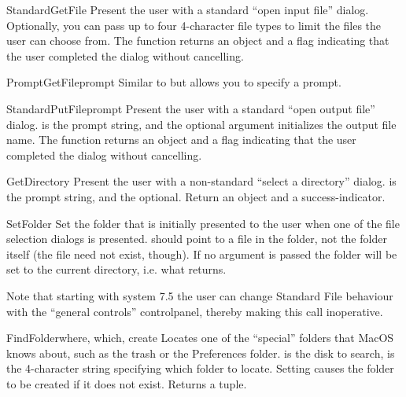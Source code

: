 \begin{funcdesc}{StandardGetFile}{}
Present the user with a standard ``open input file''
dialog. Optionally, you can pass up to four 4-character file types to limit
the files the user can choose from. The function returns an 
object and a flag indicating that the user completed the dialog
without cancelling.
\end{funcdesc}

\begin{funcdesc}{PromptGetFile}{prompt}
Similar to  but allows you to specify a
prompt.
\end{funcdesc}

\begin{funcdesc}{StandardPutFile}{prompt}
Present the user with a standard ``open output file''
dialog.  is the prompt string, and the optional
 argument initializes the output file name. The function
returns an  object and a flag indicating that the user
completed the dialog without cancelling.
\end{funcdesc}

\begin{funcdesc}{GetDirectory}{}
Present the user with a non-standard ``select a directory''
dialog.  is the prompt string, and the optional.
Return an  object and a success-indicator.
\end{funcdesc}

\begin{funcdesc}{SetFolder}{}
Set the folder that is initially presented to the user when one of
the file selection dialogs is presented.  should point to
a file in the folder, not the folder itself (the file need not exist,
though). If no argument is passed the folder will be set to the
current directory, i.e. what  returns.

Note that starting with system 7.5 the user can change Standard File
behaviour with the ``general controls'' controlpanel, thereby making
this call inoperative.
\end{funcdesc}

\begin{funcdesc}{FindFolder}{where, which, create}
Locates one of the ``special'' folders that MacOS knows about, such as
the trash or the Preferences folder.  is the disk to
search,  is the 4-character string specifying which folder to
locate. Setting  causes the folder to be created if it
does not exist. Returns a  tuple.
\end{funcdesc}

